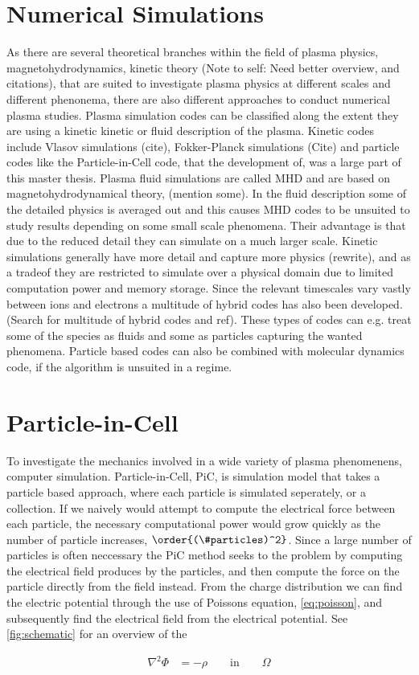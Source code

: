 \section{Numerical Simulations}
	As there are several theoretical branches within the field of plasma physics,
	magnetohydrodynamics, kinetic theory (Note to self:  Need better overview, and citations),
	that are suited to investigate plasma physics at different scales and different phenonema,
	there are also different approaches to conduct numerical plasma studies.
	Plasma simulation codes can be classified along the extent they are using a
	kinetic kinetic or fluid description of the plasma. Kinetic codes include
	Vlasov simulations (cite), Fokker-Planck simulations (Cite) and particle codes like the
	Particle-in-Cell code, that the development of, was a large part of this master thesis.
	Plasma fluid simulations are called MHD and are based on magnetohydrodynamical theory, (mention some).
	In the fluid description some of the detailed physics is averaged out and this causes
	MHD codes to be unsuited to study results depending on some small scale phenomena.
	Their advantage is that due to the reduced detail they can simulate on a much larger scale.
	Kinetic simulations generally have more detail and capture more physics (rewrite),
	and as a tradeof they are restricted to simulate over a physical domain due to
	limited computation power and memory storage.
	Since the relevant timescales vary vastly between ions and electrons a multitude
	of hybrid codes has also been developed. (Search for multitude of hybrid codes and ref).
	These types of codes can e.g. treat some of the species as fluids and some as
	particles capturing the wanted phenomena. Particle based codes can also be combined
	with molecular dynamics code, if the algorithm is unsuited in a regime.



	\section{Particle-in-Cell}
	 To investigate the mechanics involved in a wide variety of plasma phenomenens,
	 computer simulation. Particle-in-Cell, PiC, is simulation model that takes a
	 particle based approach, where each particle is simulated seperately, or a
	 collection. If we naively would attempt to compute the electrical force between each particle, the necessary
	 computational power would grow quickly as the number of particle increases, \(\order{(\#particles)^2}\).
	 Since a large number of particles is often neccessary the PiC method seeks to
	 the problem by computing the electrical field produces by the particles, and then
	 compute the force on the particle directly from the field instead. From the charge
	 distribution we can find the electric potential through the use of Poissons
	 equation, \cref{eq:poisson}, and subsequently find the electrical field from
	 the electrical potential. See \cref{fig:schematic} for an overview of the

		\begin{align}
			\nabla ^2 \Phi &= -\rho \qquad \text{in} \qquad \Omega \label{eq:poisson}
		\end{align}

	  

